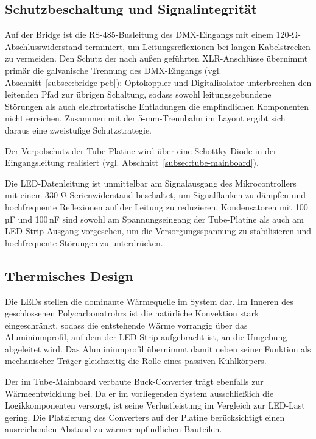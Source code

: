 \subsection{Schutzbeschaltung und Signalintegrität}
\label{subsec:schutz-signalintegritaet}

Auf der Bridge ist die RS-485-Busleitung des DMX-Eingangs
mit einem 120-Ω-Abschlusswiderstand terminiert, um
Leitungsreflexionen bei langen Kabelstrecken zu vermeiden.
Den Schutz der nach außen geführten XLR-Anschlüsse übernimmt
primär die galvanische Trennung des DMX-Eingangs
(vgl. Abschnitt~\ref{subsec:bridge-pcb}): Optokoppler und
Digitalisolator unterbrechen den leitenden Pfad zur übrigen
Schaltung, sodass sowohl leitungsgebundene Störungen als auch
elektrostatische Entladungen die empfindlichen Komponenten
nicht erreichen. Zusammen mit der 5-mm-Trennbahn im Layout
ergibt sich daraus eine zweistufige Schutzstrategie.

Der Verpolschutz der Tube-Platine wird über eine
Schottky-Diode in der Eingangsleitung realisiert
(vgl. Abschnitt~\ref{subsec:tube-mainboard}).

Die LED-Datenleitung ist unmittelbar am Signalausgang des
Mikrocontrollers mit einem 330-Ω-Serienwiderstand beschaltet,
um Signalflanken zu dämpfen und hochfrequente Reflexionen auf
der Leitung zu reduzieren. 
Kondensatoren mit 100\,µF und 100\,nF sind sowohl am Spannungseingang
der Tube-Platine als auch am LED-Strip-Ausgang vorgesehen,
um die Versorgungsspannung zu stabilisieren und hochfrequente
Störungen zu unterdrücken.

\subsection{Thermisches Design}
\label{subsec:thermik}

Die LEDs stellen die dominante Wärmequelle im System dar. Im
Inneren des geschlossenen Polycarbonatrohrs ist die natürliche
Konvektion stark eingeschränkt, sodass die entstehende Wärme
vorrangig über das Aluminiumprofil, auf dem der LED-Strip
aufgebracht ist, an die Umgebung abgeleitet wird. Das
Aluminiumprofil übernimmt damit neben seiner Funktion als
mechanischer Träger gleichzeitig die Rolle eines passiven
Kühlkörpers.

Der im Tube-Mainboard verbaute Buck-Converter trägt ebenfalls
zur Wärmeentwicklung bei. Da er im vorliegenden System
ausschließlich die Logikkomponenten versorgt, ist seine
Verlustleistung im Vergleich zur LED-Last gering. Die
Platzierung des Converters auf der Platine berücksichtigt
einen ausreichenden Abstand zu wärmeempfindlichen Bauteilen.

